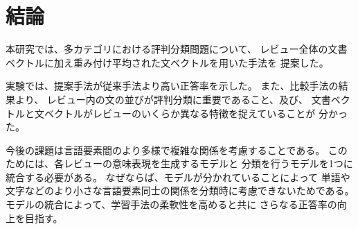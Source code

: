 \section{結論}

本研究では、多カテゴリにおける評判分類問題について、
レビュー全体の文書ベクトルに加え重み付け平均された文ベクトルを用いた手法を
提案した。

実験では、提案手法が従来手法\cite{fujitani15}より高い正答率を示した。
また、比較手法の結果より、
レビュー内の文の並びが評判分類に重要であること、及び、
文書ベクトルと文ベクトルがレビューのいくらか異なる特徴を捉えていることが
分かった。

今後の課題は言語要素間のより多様で複雑な関係を考慮することである。
このためには、各レビューの意味表現を生成するモデルと
分類を行うモデルを1つに統合する必要がある。
なぜならば、モデルが分かれていることによって
単語や文字などのより小さな言語要素同士の関係を分類時に考慮できないためである。
モデルの統合によって、学習手法の柔軟性を高めると共に
さらなる正答率の向上を目指す。


%
%
